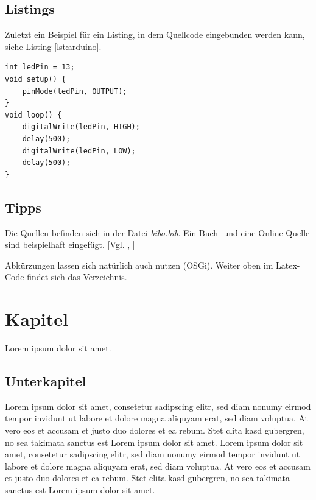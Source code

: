 \documentclass[12pt,a4paper,bibliography=totocnumbered,listof=totocnumbered]{scrartcl}
\begin{document}
\subsection{Listings}
Zuletzt ein Beispiel für ein Listing, in dem Quellcode eingebunden werden kann, siehe Listing \ref{lst:arduino}.

\vspace{1em}
\begin{lstlisting}[caption=Arduino Beispielprogramm, label=lst:arduino]
int ledPin = 13;
void setup() {
    pinMode(ledPin, OUTPUT);
}
void loop() {
    digitalWrite(ledPin, HIGH);
    delay(500);
    digitalWrite(ledPin, LOW);
    delay(500);
}
\end{lstlisting}

\subsection{Tipps}
Die Quellen befinden sich in der Datei \textit{bibo.bib}. Ein Buch- und eine Online-Quelle sind beispielhaft eingefügt. [Vgl. \cite{buch}, \cite{online}]

Abkürzungen lassen sich natürlich auch nutzen (\ac{OSGi}). Weiter oben im Latex-Code findet sich das Verzeichnis.
\pagebreak

\section{Kapitel}
Lorem ipsum dolor sit amet.

\subsection{Unterkapitel}
Lorem ipsum dolor sit amet, consetetur sadipscing elitr, sed diam nonumy eirmod tempor invidunt ut labore et dolore magna aliquyam erat, sed diam voluptua. At vero eos et accusam et justo duo dolores et ea rebum. Stet clita kasd gubergren, no sea takimata sanctus est Lorem ipsum dolor sit amet. Lorem ipsum dolor sit amet, consetetur sadipscing elitr, sed diam nonumy eirmod tempor invidunt ut labore et dolore magna aliquyam erat, sed diam voluptua. At vero eos et accusam et justo duo dolores et ea rebum. Stet clita kasd gubergren, no sea takimata sanctus est Lorem ipsum dolor sit amet.
\end{document}
